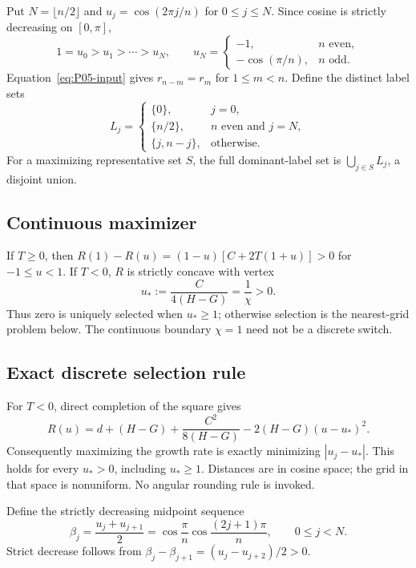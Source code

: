 Put $N=\lfloor n/2\rfloor$ and $u_j=\cos(2\pi j/n)$ for $0\le j\le N$.
Since cosine is strictly decreasing on $[0,\pi]$,
\begin{equation}
 1=u_0>u_1>\cdots>u_N,\qquad
 u_N=\begin{cases}-1,&n\text{ even},\\-\cos(\pi/n),&n\text{ odd}.
 \end{cases}
 \label{eq:P05-grid}
\end{equation}
Equation~\eqref{eq:P05-input} gives $r_{n-m}=r_m$ for $1\le m<n$.
Define the distinct label sets
\begin{equation}
 L_j=\begin{cases}
 \{0\},&j=0,\\
 \{n/2\},&n\text{ even and }j=N,\\
 \{j,n-j\},&\text{otherwise}.
 \end{cases}
 \label{eq:P05-labels}
\end{equation}
For a maximizing representative set $S$, the full dominant-label set is
$\bigcup_{j\in S}L_j$, a disjoint union.


\subsection{Continuous maximizer}
If $T\ge0$, then
$R(1)-R(u)=(1-u)[C+2T(1+u)]>0$ for $-1\le u<1$.
If $T<0$, $R$ is strictly concave with vertex
\begin{equation}
 u_*:=\frac{C}{4(H-G)}=\frac1\chi>0.
 \label{eq:P05-vertex}
\end{equation}
Thus zero is uniquely selected when $u_*\ge1$; otherwise selection
is the nearest-grid problem below. The continuous boundary $\chi=1$
need not be a discrete switch.

\subsection{Exact discrete selection rule}
\label{slot:P05-2}
For $T<0$, direct completion of the square gives
\begin{equation}
 R(u)=d+(H-G)+\frac{C^2}{8(H-G)}
           -2(H-G)(u-u_*)^2.
 \label{eq:P05-square}
\end{equation}
Consequently maximizing the growth rate is exactly minimizing
$|u_j-u_*|$. This holds for every $u_*>0$, including $u_*\ge1$.
Distances are in cosine space; the grid in that space is nonuniform.
No angular rounding rule is invoked.

Define the strictly decreasing midpoint sequence
\begin{equation}
 \beta_j=\frac{u_j+u_{j+1}}2
 =\cos\frac\pi n\cos\frac{(2j+1)\pi}{n},\qquad 0\le j<N.
 \label{eq:P05-midpoints}
\end{equation}
Strict decrease follows from
$\beta_j-\beta_{j+1}=(u_j-u_{j+2})/2>0$.

